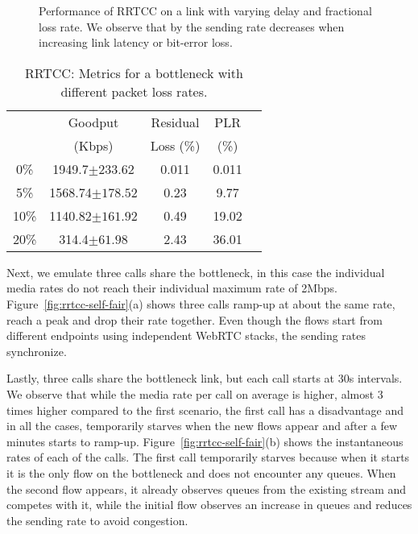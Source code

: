 \begin{figure}
  \centerline{
   }
   \centerline{
  }
  \caption{Performance of RRTCC on a link with varying delay and fractional
  loss rate. We observe that by the sending rate decreases when increasing
  link latency or bit-error loss. }
  \label{fig:rrtcc-single}
\end{figure}

\begin{table}
\begin{center}{
\begin{tabular}{ ccccc }
\hline
 & Goodput & Residual  & PLR\\
 & (Kbps)  & Loss (\%) & (\%)\\
\hline
 0\% & 1949.7$\pm233.62$ & 0.011 & 0.011 \\ 
 5\% & 1568.74$\pm178.52$ & 0.23 & 9.77 \\ 
 10\% & 1140.82$\pm161.92$ & 0.49 & 19.02 \\ 
 20\% & 314.4$\pm61.98$ & 2.43 & 36.01 \\ \hline
\end{tabular}
}
\end{center}
\caption{RRTCC: Metrics for a bottleneck with different packet loss rates.}
\label{tab:rrtcc-loss}
\end{table}


Next, we emulate three calls share the bottleneck, in this case the individual
media rates do not reach their individual maximum rate of 2Mbps.
Figure~\ref{fig:rrtcc-self-fair}(a) shows three calls ramp-up at about the
same rate, reach a peak and drop their rate together. Even though the flows
start from different endpoints using independent WebRTC stacks, the sending
rates synchronize.

Lastly, three calls share the bottleneck link, but each call starts at 30s
intervals. We observe that while the media rate per call on average is higher,
almost 3 times higher compared to the first scenario, the first call has a
disadvantage and in all the cases, temporarily starves when the new flows
appear and after a few minutes starts to ramp-up.
Figure~\ref{fig:rrtcc-self-fair}(b) shows the instantaneous rates of each of
the calls. The first call temporarily starves because when it starts it is the
only flow on the bottleneck and does not encounter any queues. When the second
flow appears, it already observes queues from the existing stream and competes
with it, while the initial flow observes an increase in queues and reduces the
sending rate to avoid congestion.

